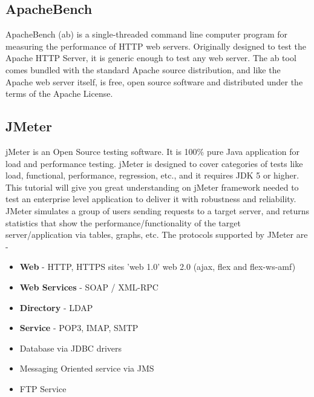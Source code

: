 \documentclass[../thesis.tex]{subfiles}
\begin{document}
\subsection{ApacheBench}
ApacheBench (ab) is a single-threaded command line computer program for measuring the performance of HTTP web servers. Originally designed to test the Apache HTTP Server, it is generic enough to test any web server.
The ab tool comes bundled with the standard Apache source distribution, and like the Apache web server itself, is free, open source software and distributed under the terms of the Apache License. \cite{ab}

\subsection{JMeter}
jMeter is an Open Source testing software. It is 100\% pure Java application for load and performance testing. jMeter is designed to cover categories of tests like load, functional, performance, regression, etc., and it requires JDK 5 or higher. This tutorial will give you great understanding on jMeter framework needed to test an enterprise level application to deliver it with robustness and reliability. \cite{jmeter}
\vspace{5mm}
JMeter simulates a group of users sending requests to a target server, and returns statistics that show the performance/functionality of the target server/application via tables, graphs, etc.
\vspace{5mm}
\vspace{5mm}
The protocols supported by JMeter are -

\begin{itemize}
  \item \textbf{Web} - HTTP, HTTPS sites 'web 1.0' web 2.0 (ajax, flex and flex-ws-amf)
  \vspace{5mm}
  \item \textbf{Web Services} - SOAP / XML-RPC
  \vspace{5mm}
  \item \textbf{Directory} - LDAP
  \vspace{5mm}
  \item \textbf{Service} - POP3, IMAP, SMTP
  \vspace{5mm}
  \item Database via JDBC drivers
  \vspace{5mm}
  \item Messaging Oriented service via JMS
  \vspace{5mm}
  \item FTP Service
\end{itemize}
\end{document}
